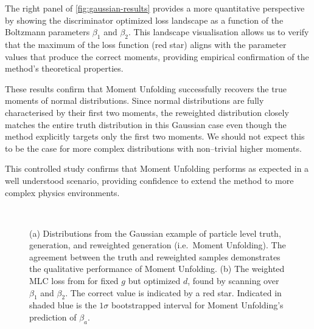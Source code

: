             The right panel of \cref{fig:gaussian-results} provides a more quantitative perspective by showing the discriminator optimized loss landscape as a function of the Boltzmann parameters $\beta_1$ and $\beta_2$.
            This landscape visualisation allows us to verify that the maximum of the loss function (red star) aligns with the parameter values that produce the correct moments, providing empirical confirmation of the method's theoretical properties.

            These results confirm that Moment Unfolding successfully recovers the true moments of normal distributions.
            Since normal distributions are fully characterised by their first two moments, the reweighted distribution closely matches the entire truth distribution in this Gaussian case even though the method explicitly targets only the first two moments.
            We should not expect this to be the case for more complex distributions with non--trivial higher moments.

        This controlled study confirms that Moment Unfolding performs as expected in a well understood scenario, providing confidence to extend the method to more complex physics environments.
\begin{figure}
    \centering
    $\qquad$
    \caption{
    (a) Distributions from the Gaussian example of particle level truth, generation, and reweighted generation (i.e.~Moment Unfolding).
    The agreement between the truth and reweighted samples demonstrates the qualitative performance of Moment Unfolding.
    (b) The weighted MLC loss from  for fixed $g$ but optimized $d$, found by scanning over $\beta_1$ and $\beta_2$.
    The correct value is indicated by a red star.
    Indicated in shaded blue is the $1\sigma$ bootstrapped interval for Moment Unfolding's prediction of $\beta_a$.
    }
        \label{fig:gauss}
\end{figure}
